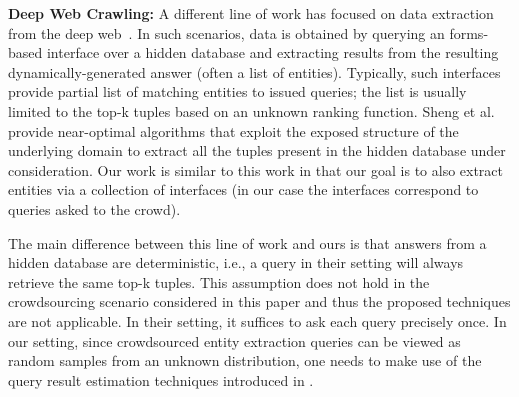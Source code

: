 \vspace{5pt}\noindent\textbf{Deep Web Crawling:} A different line of work has focused on data extraction from the deep web~\cite{Jin:2011,Sheng:2012}. In such scenarios, data is obtained by querying an forms-based interface over a hidden database and extracting results from the resulting dynamically-generated answer (often a list of entities). Typically, such interfaces provide partial list of matching entities to issued queries; the list is usually limited to the top-k tuples based on an unknown ranking function. Sheng et al.~\cite{Sheng:2012} provide near-optimal algorithms that exploit the exposed structure of the underlying domain to extract all the tuples present in the hidden database under consideration. Our work is similar to this work in that our goal is to also extract entities via a collection of interfaces (in our case the interfaces correspond to queries asked to the crowd).

The main difference between this line of work and ours is that answers from a hidden database are deterministic, i.e., a query in their setting will always retrieve the same top-k tuples. This assumption does not hold in the crowdsourcing scenario considered in this paper and thus the proposed techniques are not applicable. In their setting, it suffices to ask each query precisely once. In our setting, since crowdsourced entity extraction queries can be viewed as random samples from an unknown  distribution, one needs to make use of the query result estimation techniques introduced in .